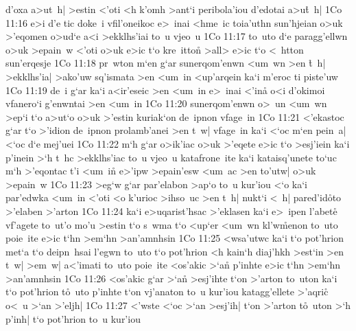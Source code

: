 d'oxa
a>ut~h|
>estin
<'oti
<h
k'omh
>ant`i
peribola'iou
d'edotai
a>u\r{t}~h|\bibvsend
{}
\vs 1Co 11:16
e>i
d'e
tic
doke~i
vfil'oneikoc
e>~inai
<hme~ic
toia'uthn
sun'hjeian
o>uk
>'eqomen
o>ud`e
a<i
>ekklhs'iai
to~u
vjeo~u\bibvsend
\vs 1Co 11:17
to~uto
d`e
paragg'ellwn
o>uk
>epain~w
<'oti
o>uk
e>ic
t`o
kre~itton\r{}
>all>
e>ic
t`o
<~htton
sun'erqesje\bibvsend
\vs 1Co 11:18
pr~wton
m`en
g`ar
sunerqom'enwn
<um~wn
>en
\r{t}~h|
>ekklhs'ia|
>ako'uw
sq'ismata
>en
<um~in
<up'arqein
ka`i
m'eroc
ti
piste'uw\bibvsend
\vs 1Co 11:19
de~i
g`ar
ka`i
a<ir'eseic
>en
<um~in
e>~inai
<'in\r{a}
o<i
d'okimoi
vfanero`i
g'enwntai
>en
<um~in\bibvsend
\vs 1Co 11:20
sunerqom'enwn
o>~un
<um~wn
>ep`i
t`o
a>ut`o
o>uk
>'estin
kuriak`on
de~ipnon
vfage~in\bibvsend
\vs 1Co 11:21
<'ekastoc
g`ar
t`o
>'idion
de~ipnon
prolamb'anei
>en
t~w|
vfage~in
ka`i
<`oc
m`en
pein~a|
<`oc
d`e
mej'uei\bibvsend
\vs 1Co 11:22
m`h
g`ar
o>ik'iac
o>uk
>'eqete
e>ic
t`o
>esj'iein
ka`i
p'inein
>`h
t~hc
>ekklhs'iac
to~u
vjeo~u
katafrone~ite
ka`i
kataisq'unete
to`uc
m`h
>'eqontac
t'i
<um~in\r{}
e>'ipw
>epain'esw
<um~ac
>en
to'utw|
o>uk
>epain~w\bibvsend
\vs 1Co 11:23
>eg`w
g`ar
par'elabon
>ap`o
to~u
kur'iou
<`o
ka`i
par'edwka
<um~in
<'oti
<o
k'urioc
>ihso~uc
>en
t~h|
nukt`i
<~h|
pared'id\r{o}to
>'elaben
>'arton\bibvsend
\vs 1Co 11:24
ka`i
e>uqarist'hsac
>'eklasen
ka`i
e>~ipen
l'abete\r{}
vf'agete
to~ut'o
mo'u
>estin
t`o
s~wma
t`o
<up`er
<um~wn
kl'w\r{m}enon
to~uto
poie~ite
e>ic
t`hn
>em`hn
>an'amnhsin\bibvsend
\vs 1Co 11:25
<wsa'utwc
ka`i
t`o
pot'hrion
met`a
t`o
deipn~hsai
l'egwn
to~uto
t`o
pot'hrion
<h
kain`h
diaj'hkh
>est`in
>en
t~w|
>em~w|
a<'imati
to~uto
poie~ite
<os'akic
>`a\r{n}
p'inhte
e>ic
t`hn
>em`hn
>an'amnhsin\bibvsend
\vs 1Co 11:26
<os'akic
g`ar
>`a\r{n}
>esj'ihte
t`on
>'arton
to~uton
ka`i
t`o
pot'hrion
t\r{o}~uto
p'inhte
t`on
vj'anaton
to~u
kur'iou
katagg'ellete
>'aqric\r{}
o<~u
>`an
>'eljh|\bibvsend
\vs 1Co 11:27
<'wste
<`oc
>`an
>esj'ih|
t`on
>'arton
t\r{o}~uton
>`h
p'inh|
t`o
pot'hrion
to~u
kur'iou

